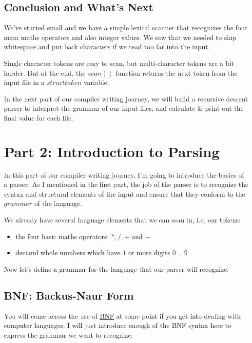 \documentclass[journal, onecolumn, 12pt]{IEEEtran}
\begin{document}
\subsection{Conclusion and What's Next}

We've started small and we have a simple lexical scanner that recognizes the four main maths operators and also integer values. We saw that we needed to skip whitespace and put back characters if we read too far into the input.

Single character tokens are easy to scan, but multi-character tokens are a bit harder. But at the end, the $scan()$ function returns the next token from the input file in a $struct token$ variable.

In the next part of our compiler writing journey, we will build a recursive descent parser to interpret the grammar of our input files, and calculate \& print out the final value for each file.

\section{Part 2: Introduction to Parsing}

In this part of our compiler writing journey, I'm going to introduce the basics of a parser. As I mentioned in the first part, the job of the parser is to recognize the syntax and structural elements of the input and ensure that they conform to the $grammer$ of the language.

We already have several language elements that we can scan in, i.e. our tokens:

\begin{itemize}
    \item the four basic maths operators: $*, /, +$ and $-$
    \item deciaml whole numbers which have $1$ or more digits $0$ .. $9$
\end{itemize}

Now let's define a grammar for the language that our parser will recognize.

\subsection{BNF: Backus-Naur Form}

You will come across the use of \href{https://en.wikipedia.org/wiki/Backus%E2%80%93Naur_form}{BNF} at some point if you get into dealing with computer languages. I will just introduce enough of the BNF syntax here to express the grammar we want to recognize.
\end{document}
